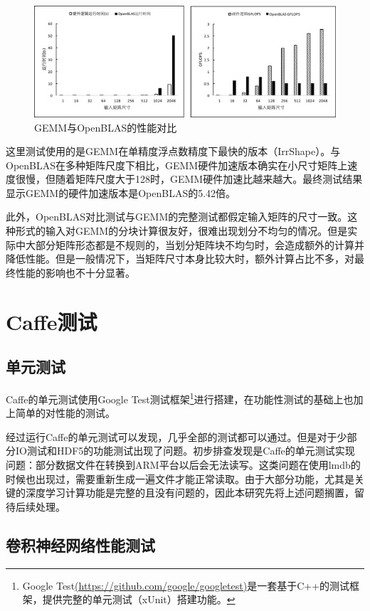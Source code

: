 \begin{figure}[!ht]
\centering	
\includegraphics[width=\textwidth]{assets/imgs/gemmblas.pdf}
\caption{GEMM与OpenBLAS的性能对比}
\label{fig:gemmblas}
\end{figure}

这里测试使用的是GEMM在单精度浮点数精度下最快的版本（IrrShape）。与OpenBLAS在多种矩阵尺度下相比，GEMM硬件加速版本确实在小尺寸矩阵上速度很慢，但随着矩阵尺度大于128时，GEMM硬件加速比越来越大。最终测试结果显示GEMM的硬件加速版本是OpenBLAS的5.42倍。

此外，OpenBLAS对比测试与GEMM的完整测试都假定输入矩阵的尺寸一致。这种形式的输入对GEMM的分块计算很友好，很难出现划分不均匀的情况。但是实际中大部分矩阵形态都是不规则的，当划分矩阵块不均匀时，会造成额外的计算并降低性能。但是一般情况下，当矩阵尺寸本身比较大时，额外计算占比不多，对最终性能的影响也不十分显著。

\section{Caffe测试}

\subsection{单元测试}

Caffe的单元测试使用Google Test测试框架\footnote{Google Test\url{(https://github.com/google/googletest)}是一套基于C++的测试框架，提供完整的单元测试（xUnit）搭建功能。}进行搭建，在功能性测试的基础上也加上简单的对性能的测试。

经过运行Caffe的单元测试可以发现，几乎全部的测试都可以通过。但是对于少部分IO测试和HDF5的功能测试出现了问题。初步排查发现是Caffe的单元测试实现问题：部分数据文件在转换到ARM平台以后会无法读写。这类问题在使用lmdb的时候也出现过，需要重新生成一遍文件才能正常读取。由于大部分功能，尤其是关键的深度学习计算功能是完整的且没有问题的，因此本研究先将上述问题搁置，留待后续处理。

\subsection{卷积神经网络性能测试}

